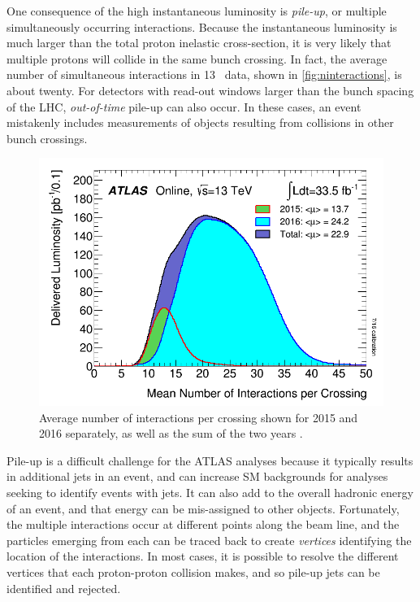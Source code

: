 One consequence of the high instantaneous luminosity is \textit{pile-up}, or multiple simultaneously occurring interactions. Because the instantaneous luminosity is much larger than the total proton inelastic cross-section, it is very likely that multiple protons will collide in the same bunch crossing. In fact, the average number of simultaneous interactions in 13 \tev~data, shown in \autoref{fig:ninteractions}, is about twenty. For detectors with read-out windows larger than the bunch spacing of the \ac{LHC}, \textit{out-of-time} pile-up can also occur. In these cases, an event mistakenly includes measurements of objects resulting from collisions in other bunch crossings. 

\begin{centering}
\begin{figure}[!hbt]
\myfloatalign
\includegraphics[width=.85\linewidth]{figures/lhc/mu_2015_2016_LHCC.png}
\caption{Average number of interactions per crossing shown for 2015 and 2016 separately, as well as the sum of the two years \cite{lumi2}.}
\label{fig:ninteractions}
\end{figure}
\end{centering}

Pile-up is a difficult challenge for the \ac{ATLAS} analyses because it typically results in additional jets in an event, and can increase \ac{SM} backgrounds for analyses seeking to identify events with jets. It can also add to the overall hadronic energy of an event, and that energy can be mis-assigned to other objects. Fortunately, the multiple interactions occur at different points along the beam line, and the particles emerging from each can be traced back to create \textit{vertices} identifying the location of the interactions. In most cases, it is possible to resolve the different vertices that each proton-proton collision makes, and so pile-up jets can be identified and rejected. 



